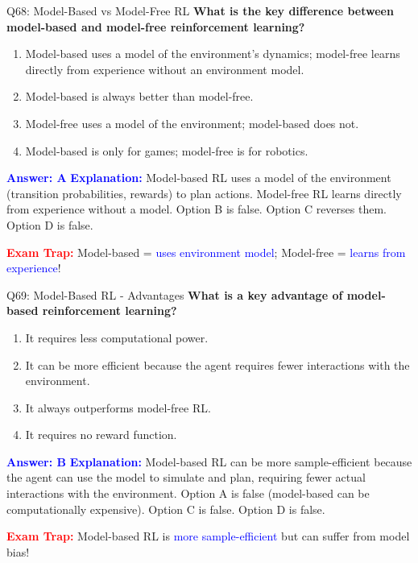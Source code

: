 \documentclass[8pt]{beamer}
\begin{document}
	\begin{frame}{Q68: Model-Based vs Model-Free RL}
		\fontsize{6.5}{7.5}\selectfont
		\textbf{What is the key difference between model-based and model-free reinforcement learning?}
		
		\begin{enumerate}
			\item Model-based uses a model of the environment's dynamics; model-free learns directly from experience without an environment model.
			\item Model-based is always better than model-free.
			\item Model-free uses a model of the environment; model-based does not.
			\item Model-based is only for games; model-free is for robotics.
		\end{enumerate}
		
		\vspace{0.1cm}
		\textcolor{blue}{\textbf{Answer: A}}
		\vspace{0.1cm}
		\textcolor{blue}{\textbf{Explanation:}} Model-based RL uses a model of the environment (transition probabilities, rewards) to plan actions. Model-free RL learns directly from experience without a model. Option B is false. Option C reverses them. Option D is false.
		
		\textcolor{red}{\textbf{Exam Trap:}} Model-based = \textcolor{blue}{uses environment model}; Model-free = \textcolor{blue}{learns from experience}!
	\end{frame}
	
	\begin{frame}{Q69: Model-Based RL - Advantages}
		\fontsize{6.5}{7.5}\selectfont
		\textbf{What is a key advantage of model-based reinforcement learning?}
		
		\begin{enumerate}
			\item It requires less computational power.
			\item It can be more efficient because the agent requires fewer interactions with the environment.
			\item It always outperforms model-free RL.
			\item It requires no reward function.
		\end{enumerate}
		
		\vspace{0.1cm}
		\textcolor{blue}{\textbf{Answer: B}}
		\vspace{0.1cm}
		\textcolor{blue}{\textbf{Explanation:}} Model-based RL can be more sample-efficient because the agent can use the model to simulate and plan, requiring fewer actual interactions with the environment. Option A is false (model-based can be computationally expensive). Option C is false. Option D is false.
		
		\textcolor{red}{\textbf{Exam Trap:}} Model-based RL is \textcolor{blue}{more sample-efficient} but can suffer from model bias!
	\end{frame}
	
\end{document}
